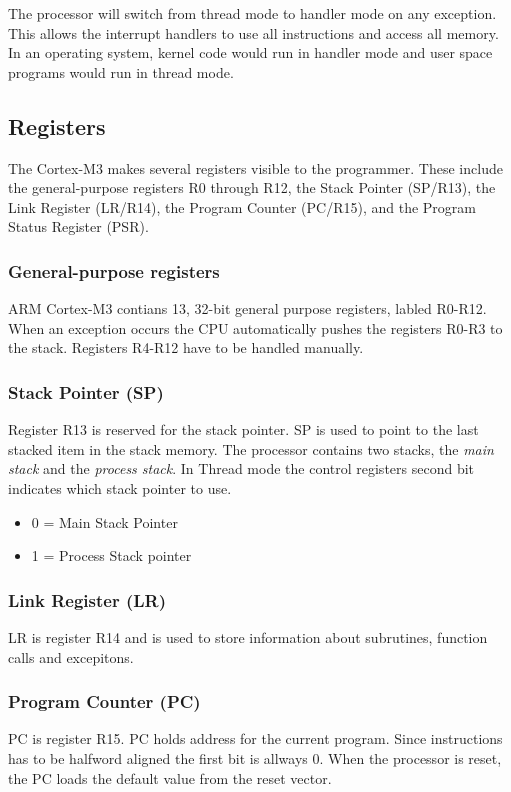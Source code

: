 The processor will switch from thread mode to handler mode on any exception. This allows the interrupt handlers to use all instructions and access all memory. In an operating system, kernel code would run in handler mode and user space programs would run in thread mode.\cite{CortexM3-RM}

\subsection{Registers}
The Cortex-M3 makes several registers visible to the programmer. These include the general-purpose registers R0 through R12, the Stack Pointer (SP/R13), the Link Register (LR/R14), the Program Counter (PC/R15), and the Program Status Register (PSR). 

\subsubsection{General-purpose registers}
ARM Cortex-M3 contians 13, 32-bit general purpose registers, labled R0-R12. When an exception occurs the CPU automatically pushes the registers R0-R3 to the stack. Registers R4-R12 have to be handled manually.

\subsubsection{Stack Pointer (SP)}
Register R13 is reserved for the stack pointer. SP is used to point to the last stacked item in the stack memory. The processor contains two stacks, the \emph{main stack} and the \emph{process stack}. In Thread mode the control registers second bit indicates which stack pointer to use.

\begin{itemize}
\item 0 = Main Stack Pointer
\item 1 = Process Stack pointer
\end{itemize}

\subsubsection{Link Register (LR)}
LR is register R14 and is used to store information about subrutines, function calls and excepitons.

\subsubsection{Program Counter (PC)}
PC is register R15. PC holds address for the current program. Since instructions has to be halfword aligned the first bit is allways 0. When the processor is reset, the PC loads the default value from the reset vector. 

